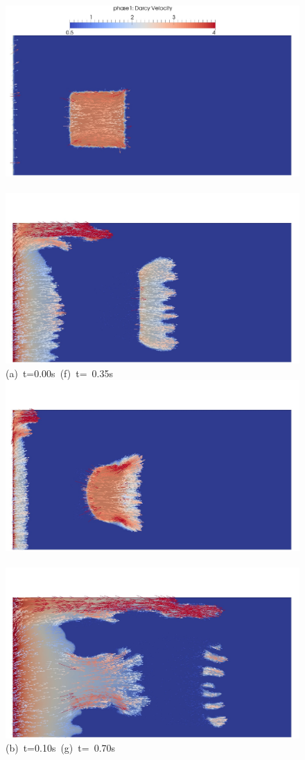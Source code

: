 \clearpage
  \begin{figure}[ht]
  \vbox{\vspace{-2.5cm}
      \hbox{\includegraphics[width=.45\textwidth]{./Pics1/Section4_4/5r_po_left_inlet_adapt_D10velb.pdf} 
            \includegraphics[width=.45\textwidth]{./Pics1/Section4_4/5r_po_left_inlet_adapt_D350velb.pdf}}
      \vspace{-.1cm}\hbox{\hspace{2.cm}(a) t=0.00s \hspace{4cm} (f) t= 0.35s}\vspace{-.1cm}
      \hbox{\includegraphics[width=.45\textwidth]{./Pics1/Section4_4/5r_po_left_inlet_adapt_D100velb.pdf} 
            \includegraphics[width=.45\textwidth]{./Pics1/Section4_4/5r_po_left_inlet_adapt_D700velb.pdf}}
      \vspace{-.1cm}\hbox{\hspace{2.cm}(b) t=0.10s \hspace{4cm} (g) t= 0.70s}\vspace{-.1cm}
}
\end{figure}
